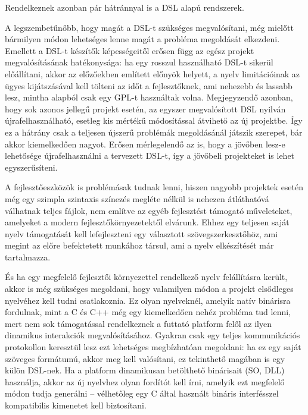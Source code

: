 Rendelkeznek azonban pár hátránnyal is a \gls{DSL} alapú rendszerek.

A legszembetűnőbb, hogy magát a \gls{DSL}-t szükséges megvalósítani, még mielőtt bármilyen módon lehetséges lenne magát a probléma megoldását elkezdeni.
Emellett a \gls{DSL}-t készítők képességeitől erősen függ az egész projekt megvalósításának hatékonysága: ha egy rosszul használható \gls{DSL}-t sikerül előállítani, akkor az előzőekben említett előnyök helyett, a nyelv limitációinak az ügyes kijátszásával kell tölteni az időt a fejlesztőknek, ami nehezebb és lassabb lesz, mintha alapból csak egy \gls{GPL}-t használtak volna.
Megjegyzendő azonban, hogy sok azonos jellegű projekt esetén, az egyszer megvalósított \gls{DSL} nyilván újrafelhasználható, esetleg kis mértékű módosítással átvihető az új projektbe. Így ez a hátrány csak a teljesen újszerű problémák megoldásánál játszik szerepet, bár akkor kiemelkedően nagyot.
Erősen mérlegelendő az is, hogy a jövőben lesz-e lehetősége újrafelhasználni a tervezett \gls{DSL}-t, így a jövőbeli projekteket is lehet egyszerűsíteni.

A fejlesztőeszközök is problémásak tudnak lenni, hiszen nagyobb projektek esetén még egy szimpla szintaxis színezés megléte nélkül is nehezen átláthatóvá válhatnak teljes fájlok, nem említve az egyéb fejlesztést támogató műveleteket, amelyeket a modern fejlesztőkörnyezetektől elvárunk.
Ehhez egy teljesen saját nyelv támogatását kell lefejleszteni egy választott szövegszerkesztőhöz, ami megint az előre befektetett munkához társul, ami a nyelv elkészítését már tartalmazza.

És ha egy megfelelő fejlesztői környezettel rendelkező nyelv felállításra került, akkor is még szükséges megoldani, hogy valamilyen módon a projekt elsődleges nyelvéhez kell tudni csatlakoznia.
Ez olyan nyelveknél, amelyik natív binárisra fordulnak, mint a C és C++ még egy kiemelkedően nehéz probléma tud lenni, mert nem sok támogatással rendelkeznek a futtató platform felől az ilyen dinamikus interakciók megvalósításához.
Gyakran csak egy teljes kommunikációs protokollon keresztül lesz ezt lehetséges megbízhatóan megoldani: ha ez egy saját szöveges formátumú, akkor meg kell valósítani, ez tekinthető magában is egy külön \gls{DSL}-nek.
Ha a platform dinamikusan betölthető binárisait (\gls{SO}, \gls{DLL}) használja, akkor az új nyelvhez olyan fordítót kell írni, amelyik ezt megfelelő módon tudja generálni -- vélhetőleg egy C által használt bináris interfésszel kompatibilis kimenetet kell biztosítani.

